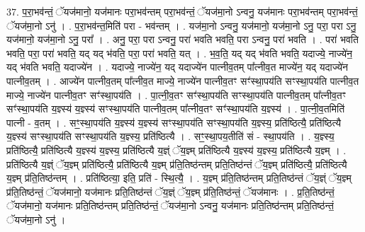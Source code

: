 \documentclass[17pt]{extarticle}
\begin{document}
37. प॒रा॒भव॑न्तं॒ ॅयज॑मानो॒ यज॑मानः परा॒भव॑न्तम् परा॒भव॑न्तं॒ ॅयज॑मा॒नो ऽन्वनु॒ यज॑मानः परा॒भव॑न्तम् परा॒भव॑न्तं॒ ॅयज॑मा॒नो ऽनु॑ । . प॒रा॒भव॑न्त॒मिति॑ परा - भव॑न्तम् । . यज॑मा॒नो ऽन्वनु॒ यज॑मानो॒ यज॑मा॒नो ऽनु॒ परा॒ परा ऽनु॒ यज॑मानो॒ यज॑मा॒नो ऽनु॒ परा᳚ । . अनु॒ परा॒ परा ऽन्वनु॒ परा॑ भवति भवति॒ परा ऽन्वनु॒ परा॑ भवति । . परा॑ भवति भवति॒ परा॒ परा॑ भवति॒ यद् यद् भ॑वति॒ परा॒ परा॑ भवति॒ यत् । . भ॒व॒ति॒ यद् यद् भ॑वति भवति॒ यदाज्ये॒ नाज्ये॑न॒ यद् भ॑वति भवति॒ यदाज्ये॑न । . यदाज्ये॒ नाज्ये॑न॒ यद् यदाज्ये॑न पात्नीव॒तम् पा᳚त्नीव॒त माज्ये॑न॒ यद् यदाज्ये॑न पात्नीव॒तम् । . आज्ये॑न पात्नीव॒तम् पा᳚त्नीव॒त माज्ये॒ नाज्ये॑न पात्नीव॒तꣳ सꣳ॑स्था॒पय॑ति सꣳस्था॒पय॑ति पात्नीव॒त माज्ये॒ नाज्ये॑न पात्नीव॒तꣳ सꣳ॑स्था॒पय॑ति । . पा॒त्नी॒व॒तꣳ सꣳ॑स्था॒पय॑ति सꣳस्था॒पय॑ति पात्नीव॒तम् पा᳚त्नीव॒तꣳ सꣳ॑स्था॒पय॑ति य॒ज्ञ्स्य॑ य॒ज्ञ्स्य॑ सꣳस्था॒पय॑ति पात्नीव॒तम् पा᳚त्नीव॒तꣳ सꣳ॑स्था॒पय॑ति य॒ज्ञ्स्य॑ । . पा॒त्नी॒व॒तमिति॑ पात्नी - व॒तम् । . सꣳ॒॒स्था॒पय॑ति य॒ज्ञ्स्य॑ य॒ज्ञ्स्य॑ सꣳस्था॒पय॑ति सꣳस्था॒पय॑ति य॒ज्ञ्स्य॒ प्रति॑ष्ठित्यै॒ प्रति॑ष्ठित्यै य॒ज्ञ्स्य॑ सꣳस्था॒पय॑ति सꣳस्था॒पय॑ति य॒ज्ञ्स्य॒ प्रति॑ष्ठित्यै । . सꣳ॒॒स्था॒पय॒तीति॑ सं - स्था॒पय॑ति । . य॒ज्ञ्स्य॒ प्रति॑ष्ठित्यै॒ प्रति॑ष्ठित्यै य॒ज्ञ्स्य॑ य॒ज्ञ्स्य॒ प्रति॑ष्ठित्यै य॒ज्ञ्ं ॅय॒ज्ञ्म् प्रति॑ष्ठित्यै य॒ज्ञ्स्य॑ य॒ज्ञ्स्य॒ प्रति॑ष्ठित्यै य॒ज्ञ्म् । . प्रति॑ष्ठित्यै य॒ज्ञ्ं ॅय॒ज्ञ्म् प्रति॑ष्ठित्यै॒ प्रति॑ष्ठित्यै य॒ज्ञ्म् प्र॑ति॒तिष्ठ॑न्तम् प्रति॒तिष्ठ॑न्तं ॅय॒ज्ञ्म् प्रति॑ष्ठित्यै॒ प्रति॑ष्ठित्यै य॒ज्ञ्म् प्र॑ति॒तिष्ठ॑न्तम् । . प्रति॑ष्ठित्या॒ इति॒ प्रति॑ - स्थि॒त्यै॒ । . य॒ज्ञ्म् प्र॑ति॒तिष्ठ॑न्तम् प्रति॒तिष्ठ॑न्तं ॅय॒ज्ञ्ं ॅय॒ज्ञ्म् प्र॑ति॒तिष्ठ॑न्तं॒ ॅयज॑मानो॒ यज॑मानः प्रति॒तिष्ठ॑न्तं ॅय॒ज्ञ्ं ॅय॒ज्ञ्म् प्र॑ति॒तिष्ठ॑न्तं॒ ॅयज॑मानः । . प्र॒ति॒तिष्ठ॑न्तं॒ ॅयज॑मानो॒ यज॑मानः प्रति॒तिष्ठ॑न्तम् प्रति॒तिष्ठ॑न्तं॒ ॅयज॑मा॒नो ऽन्वनु॒ यज॑मानः प्रति॒तिष्ठ॑न्तम् प्रति॒तिष्ठ॑न्तं॒ ॅयज॑मा॒नो ऽनु॑ । \newline
\end{document}
